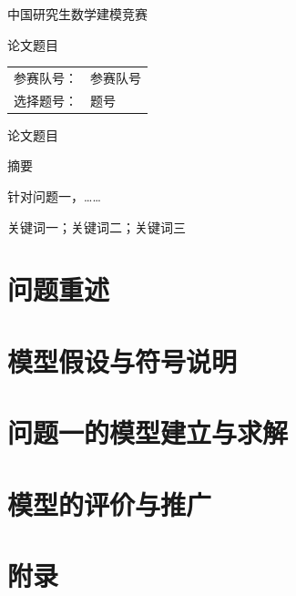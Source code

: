 \documentclass[UTF8,12pt,a4paper]{ctexart}
\newif\ifwithtoc \withtocfalse
\newcommand{\TeamNumber}{参赛队号}
\newcommand{\ProblemChosen}{题号}
\newcommand{\PaperTitle}{论文题目}
\begin{document}
\thispagestyle{empty}
\begin{center}
\vspace*{3cm}
{\heiti 中国研究生数学建模竞赛}\par\vspace{2cm}
{\heiti \PaperTitle}\par\vspace{2cm}
\begin{tabular}{rl}
参赛队号： & \TeamNumber \\
选择题号： & \ProblemChosen \\
\end{tabular}
\end{center}
\clearpage

\setcounter{page}{1}
\begin{center}
{\heiti \PaperTitle}\par\medskip
{\heiti 摘\quad 要}
\end{center}
针对问题一，……

\medskip
{}关键词一；关键词二；关键词三
\clearpage

\ifwithtoc
\tableofcontents
\clearpage
\fi

\section{问题重述}
\section{模型假设与符号说明}
\section{问题一的模型建立与求解}
\section{模型的评价与推广}

% 

\clearpage
\appendix
\section*{附录}
\end{document}
